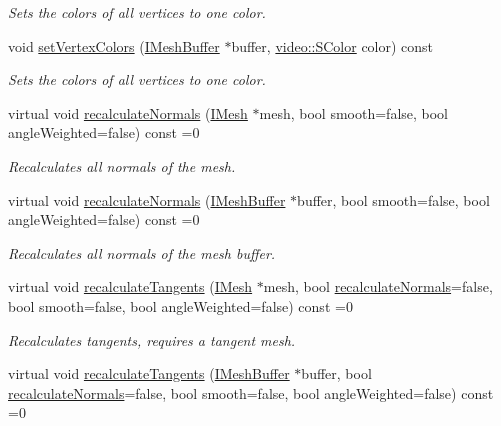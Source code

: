 \begin{DoxyCompactItemize}
\begin{DoxyCompactList}\small\item\em Sets the colors of all vertices to one color. \end{DoxyCompactList}\item 
void \hyperlink{classirr_1_1scene_1_1IMeshManipulator_ab13881bea577e0f0ffc03b102f29db6a}{set\+Vertex\+Colors} (\hyperlink{classirr_1_1scene_1_1IMeshBuffer}{I\+Mesh\+Buffer} $\ast$buffer, \hyperlink{classirr_1_1video_1_1SColor}{video\+::\+S\+Color} color) const
\begin{DoxyCompactList}\small\item\em Sets the colors of all vertices to one color. \end{DoxyCompactList}\item 
virtual void \hyperlink{classirr_1_1scene_1_1IMeshManipulator_a8dba16b7eedeac07761c9c1247944429}{recalculate\+Normals} (\hyperlink{classirr_1_1scene_1_1IMesh}{I\+Mesh} $\ast$mesh, bool smooth=false, bool angle\+Weighted=false) const =0
\begin{DoxyCompactList}\small\item\em Recalculates all normals of the mesh. \end{DoxyCompactList}\item 
virtual void \hyperlink{classirr_1_1scene_1_1IMeshManipulator_a94d8390182763e608ca43978b8866d11}{recalculate\+Normals} (\hyperlink{classirr_1_1scene_1_1IMeshBuffer}{I\+Mesh\+Buffer} $\ast$buffer, bool smooth=false, bool angle\+Weighted=false) const =0
\begin{DoxyCompactList}\small\item\em Recalculates all normals of the mesh buffer. \end{DoxyCompactList}\item 
virtual void \hyperlink{classirr_1_1scene_1_1IMeshManipulator_a0ea43e8c4e8489551228b3005d325cd6}{recalculate\+Tangents} (\hyperlink{classirr_1_1scene_1_1IMesh}{I\+Mesh} $\ast$mesh, bool \hyperlink{classirr_1_1scene_1_1IMeshManipulator_a8dba16b7eedeac07761c9c1247944429}{recalculate\+Normals}=false, bool smooth=false, bool angle\+Weighted=false) const =0
\begin{DoxyCompactList}\small\item\em Recalculates tangents, requires a tangent mesh. \end{DoxyCompactList}\item 
virtual void \hyperlink{classirr_1_1scene_1_1IMeshManipulator_a6bea784eb6cf29bdd771dde3903a2758}{recalculate\+Tangents} (\hyperlink{classirr_1_1scene_1_1IMeshBuffer}{I\+Mesh\+Buffer} $\ast$buffer, bool \hyperlink{classirr_1_1scene_1_1IMeshManipulator_a8dba16b7eedeac07761c9c1247944429}{recalculate\+Normals}=false, bool smooth=false, bool angle\+Weighted=false) const =0

\end{DoxyCompactItemize}
